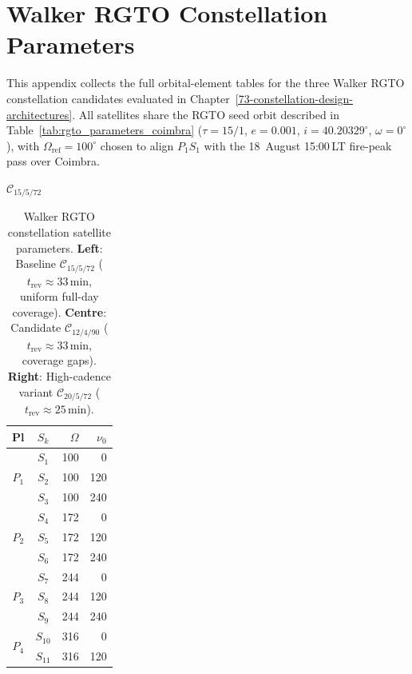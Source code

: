 \chapter{Walker RGTO Constellation Parameters}\label{app:constellation_tables}

This appendix collects the full orbital-element tables for the three Walker RGTO constellation candidates evaluated in Chapter~\ref{73-constellation-design-architectures}.  All satellites share the RGTO seed orbit described in Table~\ref{tab:rgto_parameters_coimbra} ($\tau=15/1$, $e=0.001$, $i=40.20329^{\circ}$, $\omega=0^{\circ}$), with $\Omega_{\mathrm{ref}}=100^{\circ}$ chosen to align $P_1S_1$ with the 18~August 15:00\,LT fire-peak pass over Coimbra.

\begin{table}[H]
\centering
\caption{\footnotesize{Walker RGTO constellation satellite parameters.  \textbf{Left}: Baseline $\mathcal{C}_{15/5/72}$ ($t_{\mathrm{rev}} \approx 33$\,min, uniform full-day coverage).  \textbf{Centre}: Candidate $\mathcal{C}_{12/4/90}$ ($t_{\mathrm{rev}} \approx 33$\,min, coverage gaps).  \textbf{Right}: High-cadence variant $\mathcal{C}_{20/5/72}$ ($t_{\mathrm{rev}} \approx 25$\,min).}}
\label{tab:walker_constellations}
\smallskip
\footnotesize
\setlength{\tabcolsep}{5pt}
\begin{minipage}[t]{0.32\linewidth}
\centering
\textbf{$\mathcal{C}_{15/5/72}$}\\[2pt]
\begin{tabular}{c c r r}
\toprule
Pl & $S_k$ & $\Omega$ & $\nu_0$ \\
\midrule
\multirow{3}{*}{$P_1$} & $S_1$  & 100 &   0 \\
                        & $S_2$  & 100 & 120 \\
                        & $S_3$  & 100 & 240 \\
\midrule
\multirow{3}{*}{$P_2$} & $S_4$  & 172 &   0 \\
                        & $S_5$  & 172 & 120 \\
                        & $S_6$  & 172 & 240 \\
\midrule
\multirow{3}{*}{$P_3$} & $S_7$  & 244 &   0 \\
                        & $S_8$  & 244 & 120 \\
                        & $S_9$  & 244 & 240 \\
\midrule
\multirow{3}{*}{$P_4$} & $S_{10}$ & 316 &   0 \\
                        & $S_{11}$ & 316 & 120 \\

\end{tabular}
\end{minipage}
\end{table}
